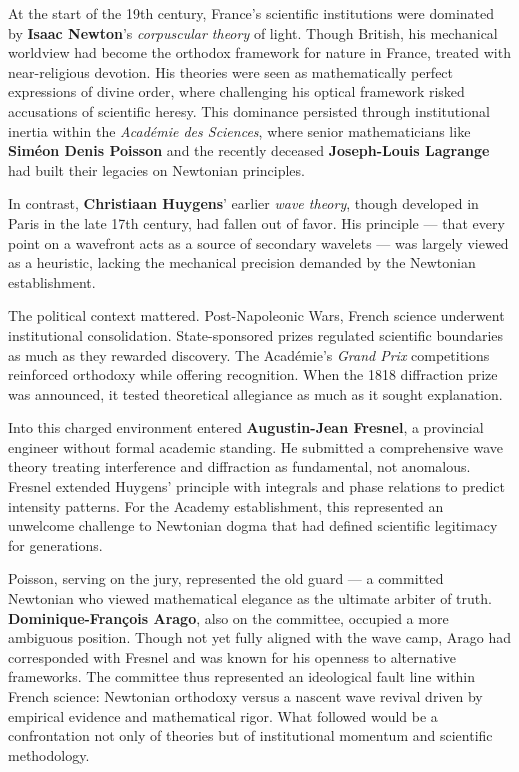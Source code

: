 \begin{historical}
At the start of the 19th century, France’s scientific institutions were dominated by \textbf{Isaac Newton}’s \emph{corpuscular theory} of light. Though British, his mechanical worldview had become the orthodox framework for nature in France, treated with near-religious devotion. His theories were seen as mathematically perfect expressions of divine order, where challenging his optical framework risked accusations of scientific heresy. This dominance persisted through institutional inertia within the \emph{Académie des Sciences}, where senior mathematicians like \textbf{Siméon Denis Poisson} and the recently deceased \textbf{Joseph-Louis Lagrange} had built their legacies on Newtonian principles.

In contrast, \textbf{Christiaan Huygens}’ earlier \emph{wave theory}, though developed in Paris in the late 17th century, had fallen out of favor. His principle — that every point on a wavefront acts as a source of secondary wavelets — was largely viewed as a heuristic, lacking the mechanical precision demanded by the Newtonian establishment.

The political context mattered. Post-Napoleonic Wars, French science underwent institutional consolidation. State-sponsored prizes regulated scientific boundaries as much as they rewarded discovery. The Académie’s \emph{Grand Prix} competitions reinforced orthodoxy while offering recognition. When the 1818 diffraction prize was announced, it tested theoretical allegiance as much as it sought explanation.

Into this charged environment entered \textbf{Augustin-Jean Fresnel}, a provincial engineer without formal academic standing. He submitted a comprehensive wave theory treating interference and diffraction as fundamental, not anomalous. Fresnel extended Huygens’ principle with integrals and phase relations to predict intensity patterns. For the Academy establishment, this represented an unwelcome challenge to Newtonian dogma that had defined scientific legitimacy for generations.

Poisson, serving on the jury, represented the old guard — a committed Newtonian who viewed mathematical elegance as the ultimate arbiter of truth. \textbf{Dominique-François Arago}, also on the committee, occupied a more ambiguous position. Though not yet fully aligned with the wave camp, Arago had corresponded with Fresnel and was known for his openness to alternative frameworks. The committee thus represented an ideological fault line within French science: Newtonian orthodoxy versus a nascent wave revival driven by empirical evidence and mathematical rigor. What followed would be a confrontation not only of theories but of institutional momentum and scientific methodology.
\end{historical}
